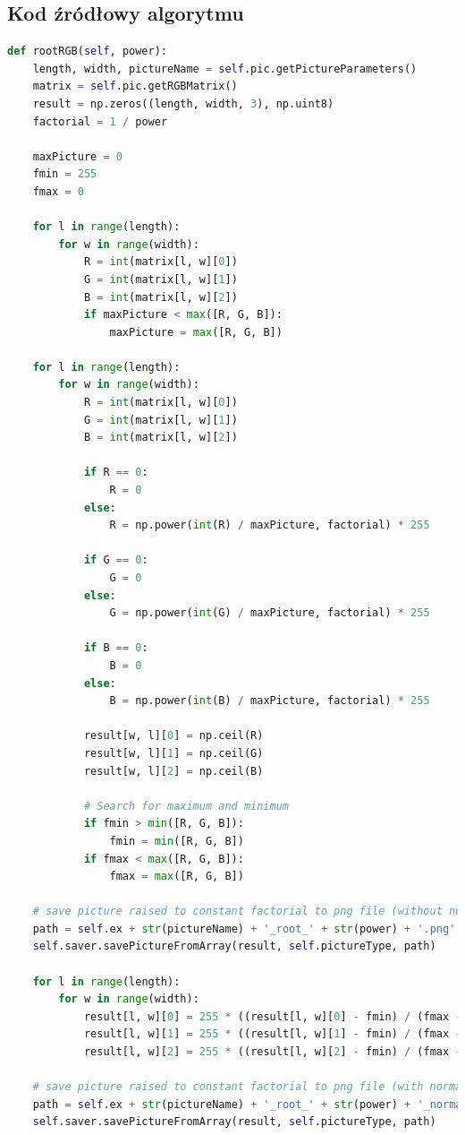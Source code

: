 \documentclass[a4paper,12pt, titlepage]{report}
\begin{document}
\subsection*{Kod źródłowy algorytmu}
\begin{lstlisting}[language=Python]
def rootRGB(self, power):
    length, width, pictureName = self.pic.getPictureParameters()
    matrix = self.pic.getRGBMatrix()
    result = np.zeros((length, width, 3), np.uint8)
    factorial = 1 / power

    maxPicture = 0
    fmin = 255
    fmax = 0

    for l in range(length):
        for w in range(width):
            R = int(matrix[l, w][0])
            G = int(matrix[l, w][1])
            B = int(matrix[l, w][2])
            if maxPicture < max([R, G, B]):
                maxPicture = max([R, G, B])

    for l in range(length):
        for w in range(width):
            R = int(matrix[l, w][0])
            G = int(matrix[l, w][1])
            B = int(matrix[l, w][2])

            if R == 0:
                R = 0
            else:
                R = np.power(int(R) / maxPicture, factorial) * 255

            if G == 0:
                G = 0
            else:
                G = np.power(int(G) / maxPicture, factorial) * 255

            if B == 0:
                B = 0
            else:
                B = np.power(int(B) / maxPicture, factorial) * 255

            result[w, l][0] = np.ceil(R)
            result[w, l][1] = np.ceil(G)
            result[w, l][2] = np.ceil(B)

            # Search for maximum and minimum
            if fmin > min([R, G, B]):
                fmin = min([R, G, B])
            if fmax < max([R, G, B]):
                fmax = max([R, G, B])

    # save picture raised to constant factorial to png file (without normalization)
    path = self.ex + str(pictureName) + '_root_' + str(power) + '.png'
    self.saver.savePictureFromArray(result, self.pictureType, path)

    for l in range(length):
        for w in range(width):
            result[l, w][0] = 255 * ((result[l, w][0] - fmin) / (fmax - fmin))
            result[l, w][1] = 255 * ((result[l, w][1] - fmin) / (fmax - fmin))
            result[l, w][2] = 255 * ((result[l, w][2] - fmin) / (fmax - fmin))

    # save picture raised to constant factorial to png file (with normalization)
    path = self.ex + str(pictureName) + '_root_' + str(power) + '_normalized.png'
    self.saver.savePictureFromArray(result, self.pictureType, path)
\end{lstlisting}
\end{document}
